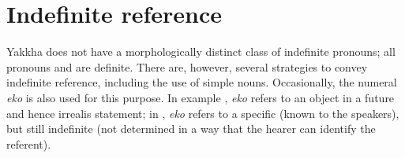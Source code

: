 \begin{table}[htp]
{\small
{}
}
\end{table}

	

\section{Indefinite reference}\label{sec-indef}

Yakkha does not have a morphologically distinct class of indefinite pronouns; all pronouns and  are definite. There are, however,  several strategies to convey indefinite reference, including the use of simple nouns. Occasionally, the numeral \emph{eko}  is also used for this purpose. In example \Next[a], \emph{eko} refers to an object in a future and hence irrealis statement; in \Next[b], \emph{eko} refers to a specific (known to the speakers), but still indefinite  (not determined in a way that the hearer can identify the referent).

